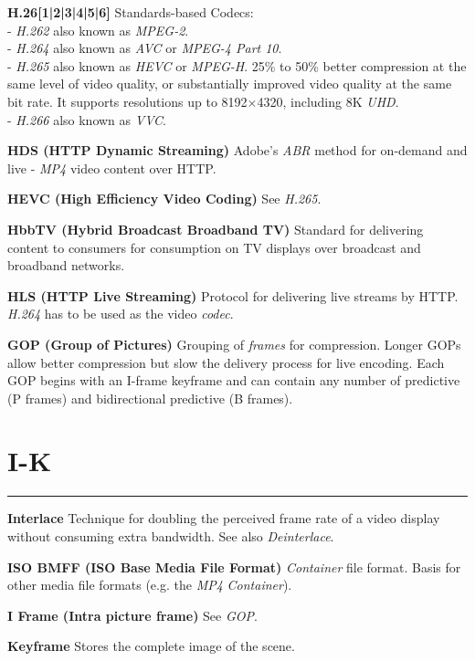 \smallskip
\textbf{H.26[1|2|3|4|5|6]}
Standards-based Codecs:\\
 - \textit{H.262} also known as \textit{MPEG-2}.\\
 - \textit{H.264} also known as \textit{AVC} or  \textit{MPEG-4 Part 10}.\\
 - \textit{H.265} also known as \textit{HEVC} or \textit{MPEG-H}. 25\% to 50\% better compression at the same level of video quality, or substantially improved video quality at the same bit rate. It supports resolutions up to 8192×4320, including 8K \textit{UHD}.\\
 - \textit{H.266} also known as \textit{VVC}.

\smallskip
\textbf{HDS (HTTP Dynamic Streaming)}
Adobe's \textit{ABR} method for on-demand and live - \textit{MP4} video content over HTTP.

\smallskip
\textbf{HEVC (High Efficiency Video Coding)}
See \textit{H.265}.

\smallskip
\textbf{HbbTV (Hybrid Broadcast Broadband TV)}
Standard for delivering content to consumers for consumption on TV displays over broadcast and broadband networks.

\smallskip
\textbf{HLS (HTTP Live Streaming)}
Protocol for delivering live streams by HTTP.  \textit{H.264} has to be used as the video \textit{codec}.

\smallskip
\textbf{GOP (Group of Pictures)}
Grouping of \textit{frames} for compression. Longer GOPs allow better compression but slow the delivery process for live encoding. Each GOP begins with an I-frame keyframe and can contain any number of predictive (P frames) and bidirectional predictive (B frames).


\section{I-K}
\hrule

\medskip
\textbf{Interlace}
Technique for doubling the perceived frame rate of a video display without consuming extra bandwidth. See also \textit{Deinterlace}.

\smallskip
\textbf{ISO BMFF (ISO Base Media File Format)}
\textit{Container} file format.  Basis for other media file formats (e.g. the \textit{MP4} \textit{Container}).

\smallskip
\textbf{I Frame (Intra picture frame)}
See \textit{GOP}.

\smallskip
\textbf{Keyframe}
Stores the complete image of the scene.

